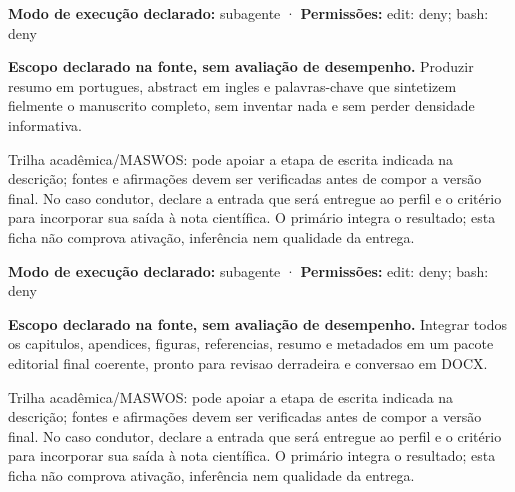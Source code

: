 \begin{arquitetura}
\textbf{Modo de execução declarado:} subagente · \textbf{Permissões:} edit: deny; bash: deny
\end{arquitetura}


\begin{descricao}
\textbf{Escopo declarado na fonte, sem avaliação de desempenho.}
Produzir resumo em portugues, abstract em ingles e palavras-chave que sintetizem fielmente o manuscrito completo, sem inventar nada e sem perder densidade informativa.
\end{descricao}

\begin{funcao}
Trilha acadêmica/MASWOS: pode apoiar a etapa de escrita indicada na descrição; fontes e afirmações devem ser verificadas antes de compor a versão final. No caso condutor, declare a entrada que será entregue ao perfil e o critério para incorporar sua saída à nota científica. O primário integra o resultado; esta ficha não comprova ativação, inferência nem qualidade da entrega.
\end{funcao}

\begin{arquitetura}
\textbf{Modo de execução declarado:} subagente · \textbf{Permissões:} edit: deny; bash: deny
\end{arquitetura}


\begin{descricao}
\textbf{Escopo declarado na fonte, sem avaliação de desempenho.}
Integrar todos os capitulos, apendices, figuras, referencias, resumo e metadados em um pacote editorial final coerente, pronto para revisao derradeira e conversao em DOCX.
\end{descricao}

\begin{funcao}
Trilha acadêmica/MASWOS: pode apoiar a etapa de escrita indicada na descrição; fontes e afirmações devem ser verificadas antes de compor a versão final. No caso condutor, declare a entrada que será entregue ao perfil e o critério para incorporar sua saída à nota científica. O primário integra o resultado; esta ficha não comprova ativação, inferência nem qualidade da entrega.
\end{funcao}


